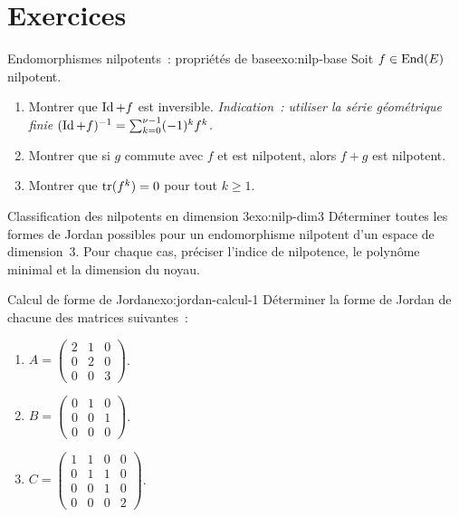 \section{Exercices}\label{sec:exos-jordan}

\begin{exercise}{Endomorphismes nilpotents~: propriétés de base}{exo:nilp-base}
  \basic
  Soit $f\in\operatorname{End}(E)$ nilpotent.
  \begin{enumerate}[label=(\alph*)]
    \item Montrer que $\operatorname{Id}+f$ est inversible. \emph{Indication~: utiliser
      la série géométrique finie $(\operatorname{Id}+f)^{-1}=\sum_{k=0}^{\nu-1}(-1)^kf^k$.}
    \item Montrer que si $g$ commute avec $f$ et est nilpotent, alors
      $f+g$ est nilpotent.
    \item Montrer que $\operatorname{tr}(f^k)=0$ pour tout $k\geq 1$.
  \end{enumerate}
\end{exercise}

\begin{exercise}{Classification des nilpotents en dimension 3}{exo:nilp-dim3}
  \basic
  Déterminer toutes les formes de Jordan possibles pour un endomorphisme
  nilpotent d'un espace de dimension~$3$. Pour chaque cas, préciser
  l'indice de nilpotence, le polynôme minimal et la dimension du noyau.
\end{exercise}

\begin{exercise}{Calcul de forme de Jordan}{exo:jordan-calcul-1}
  \intermediate
  Déterminer la forme de Jordan de chacune des matrices suivantes~:
  \begin{enumerate}[label=(\alph*)]
    \item $A=\begin{pmatrix}2&1&0\\0&2&0\\0&0&3\end{pmatrix}$.
    \item $B=\begin{pmatrix}0&1&0\\0&0&1\\0&0&0\end{pmatrix}$.
    \item $C=\begin{pmatrix}1&1&0&0\\0&1&1&0\\0&0&1&0\\0&0&0&2\end{pmatrix}$.
  \end{enumerate}
\end{exercise}

